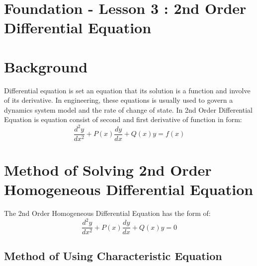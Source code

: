 \documentclass[12pt,a4paper]{article}
\begin{document}
	\section*{\centering Foundation - Lesson 3 : 2nd Order Differential Equation}
	
	\section{Background}
	Differential equation is set an equation that its solution is a function and involve of its derivative. In engineering, these equations is usually used to govern a dynamics system model and the rate of change of state. In 2nd Order Differential Equation is equation consist of second and first derivative of function in form:
	\[
	\frac{d^2y}{dx^2} + P(x)\frac{dy}{dx} + Q(x) y = f(x)
	\]
	\section{Method of Solving 2nd Order Homogeneous Differential Equation}
	The 2nd Order Homogeneous Differential Equation has the form of:
	\[
	\frac{d^2y}{dx^2} + P(x)\frac{dy}{dx} + Q(x) y = 0
	\]
	\subsection{Method of Using Characteristic Equation}
\end{document}

